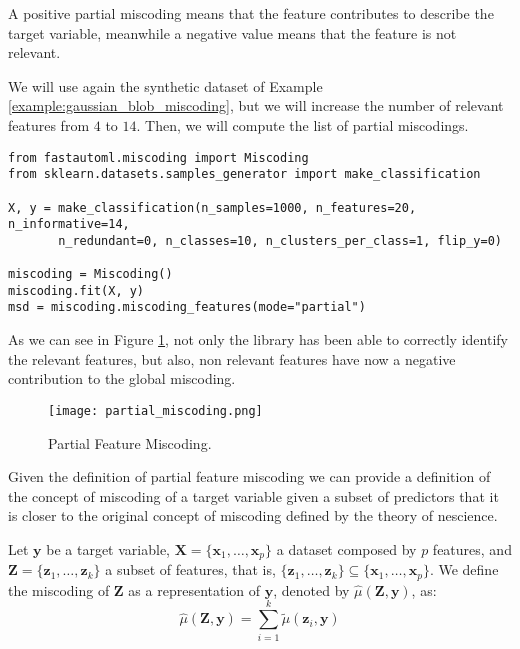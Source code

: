 A positive partial miscoding means that the feature contributes to describe the target variable, meanwhile a negative value means that the feature is not relevant.

\begin{example}
\label{example:partial_feature_miscoding}
We will use again the synthetic dataset of Example \ref{example:gaussian_blob_miscoding}, but we will increase the number of relevant features from $4$ to $14$. Then, we will compute the list of partial miscodings.

\begin{sourcecode}
{\scriptsize \begin{verbatim}
from fastautoml.miscoding import Miscoding
from sklearn.datasets.samples_generator import make_classification

X, y = make_classification(n_samples=1000, n_features=20, n_informative=14,
       n_redundant=0, n_classes=10, n_clusters_per_class=1, flip_y=0)

miscoding = Miscoding()
miscoding.fit(X, y)
msd = miscoding.miscoding_features(mode="partial")
\end{verbatim}}
\end{sourcecode}

As we can see in Figure \ref{figure:partial_feature_miscoding}, not only the library has been able to correctly identify the relevant features, but also, non relevant features have now a negative contribution to the global miscoding.

\begin{figure}[h]
\centering
\texttt{[image: partial\_miscoding.png]}
\caption{Partial Feature Miscoding.}
\label{figure:partial_feature_miscoding}
\end{figure}

\end{example}

Given the definition of partial feature miscoding we can provide a definition of the concept of miscoding of a target variable given a subset of predictors that it is closer to the original concept of miscoding defined by the theory of nescience.

\begin{definition}
Let $\mathbf{y}$ be a target variable, $\mathbf{X} = \{ \mathbf{x}_1, \ldots, \mathbf{x}_p \}$ a dataset composed by $p$ features, and $\mathbf{Z} = \{ \mathbf{z}_1, \ldots, \mathbf{z}_k \}$ a subset of features, that is, $\{ \mathbf{z}_1, \ldots, \mathbf{z}_k \} \subseteq \{ \mathbf{x}_1, \ldots, \mathbf{x}_p \}$. We define the miscoding of $\mathbf{Z}$ as a representation of $\mathbf{y}$, denoted by $\hat\mu(\mathbf{Z}, \mathbf{y})$, as:
\[
\hat\mu(\mathbf{Z}, \mathbf{y}) = \sum_{i=1}^k \tilde\mu (\mathbf{z}_i, \mathbf{y})
\]
\end{definition}

